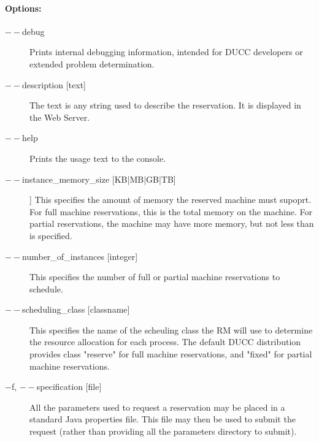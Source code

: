     \paragraph{Options:}
    
        \begin{description}

            \item[$--$debug ]          
              Prints internal debugging information, intended for DUCC developers or extended problem determination.
              
            \item[$--$description {[text]}]               
              The text is any string used to describe the reservation. It is displayed in the Web Server. 
              
            \item[$--$help ]             
              Prints the usage text to the console. 
                            
            \item[$--$instance\_memory\_size {[KB|MB|GB|TB]}]]               
              This specifies the amount of memory the reserved machine must supoprt. For full machine 
              reservations, this is the total memory on the machine. For partial reservations, the machine 
              may have more memory, but not less than is specified. 

            \item[$--$number\_of\_instances {[integer]}]               
              This specifies the number of full or partial machine reservations to schedule. 
                            
            \item[$--$scheduling\_class {[classname]}]               
              This specifies the name of the scheuling class the RM will use to determine the resource 
              allocation for each process. The default DUCC distribution provides class "reserve" for full 
              machine reservations, and "fixed" for partial machine reservations. 
              
            \item[$-$f, $--$specification {[file]}]               
              All the parameters used to request a reservation may be placed in a standard Java 
              properties file. This file may then be used to submit the request (rather than providing all 
              the parameters directory to submit). 

        \end{description}
            
